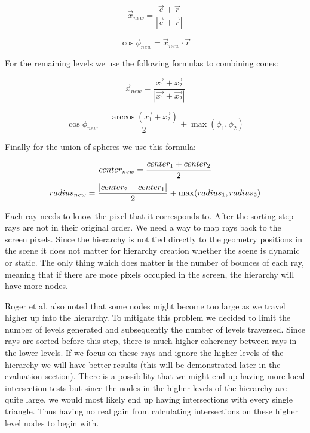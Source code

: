 \documentclass{egpubl}
\begin{document}
\begin{equation}
    \vec{x}_{new} = \frac{ \vec{e} + \vec{r} }
                         {|\vec{e} + \vec{r}|}
\end{equation}

\begin{equation}
    \cos{\phi_{new}} = \vec{x}_{new} \cdot \vec{r}
\end{equation}

For the remaining levels we use the following formulas to combining cones:

\begin{equation}
    \vec{x}_{new} = \frac{ \vec{x_{1}} + \vec{x_{2}} }
                         {|\vec{x_{1}} + \vec{x_{2}}|}
\end{equation}

\begin{equation}        
    \cos{\phi_{new}} = \frac{\arccos(\vec{x_{1}} + \vec{x_{2}})}{2} + \max(\phi_{1}, \phi_{2})
\end{equation}

Finally for the union of spheres we use this formula:

\begin{equation}
center_{new} = \frac{center_{1} + center_{2}}{2}\\
\end{equation}
\begin{equation}
radius_{new} = \frac{|center_{2} - center_{1}|}{2} + \max(radius_{1},radius_{2})\\
\end{equation}
    
Each ray needs to know the pixel that it corresponds to. After the sorting step rays are not in their original order. We need a way to map rays back to the screen pixels. Since the hierarchy is not tied directly to the geometry positions in the scene it does not matter for hierarchy creation whether the scene is dynamic or static. The only thing which does matter is the number of bounces of each ray, meaning that if there are more pixels occupied in the screen, the hierarchy will have more nodes.

\medskip

Roger et al. \cite{Roger07} also noted that some nodes might become too large as we travel higher up into the hierarchy. To mitigate this problem we decided to limit the number of levels generated and subsequently the number of levels traversed. Since rays are sorted before this step, there is much higher coherency between rays in the lower levels. If we focus on these rays and ignore the higher levels of the hierarchy we will have better results (this will be demonstrated later in the evaluation section). There is a possibility that we might end up having more local intersection tests but since the nodes in the higher levels of the hierarchy are quite large, we would most likely end up having intersections with every single triangle. Thus having no real gain from calculating intersections on these higher level nodes to begin with.
\end{document}
